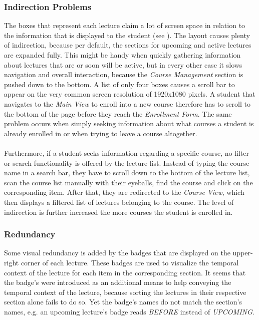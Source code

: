 \subsubsection{Indirection Problems}

The boxes that represent each lecture claim a lot of screen space in relation to the information that is displayed to the student (see ). The layout causes plenty of indirection, because per default, the sections for upcoming and active lectures are expanded fully. This might be handy when quickly gathering information about lectures that are or soon will be active, but in every other case it slows navigation and overall interaction, because the \emph{Course Management} section is pushed down to the bottom.
A list of only four boxes causes a scroll bar to appear on the very common screen resolution of 1920x1080 pixels. A student that navigates to the \emph{Main View} to enroll into a new course therefore has to scroll to the bottom of the page before they reach the \emph{Enrollment Form}. The same problem occurs when simply seeking information about what courses a student is already enrolled in or when trying to leave a course altogether. 
\\
\\
Furthermore, if a student seeks information regarding a specific course, no filter or search functionality is offered by the lecture list. Instead of typing the course name in a search bar, they have to scroll down to the bottom of the lecture list, scan the course list manually with their eyeballs, find the course and click on the corresponding item. After that, they are redirected to the \emph{Course View}, which then displays a filtered list of lectures belonging to the course. The level of indirection is further increased the more courses the student is enrolled in. 

\subsubsection{Redundancy}

Some visual redundancy is added by the badges that are displayed on the upper-right corner of each lecture. These badges are used to visualize the temporal context of the lecture for each item in the corresponding section. It seems that the badge's were introduced as an additional means to help conveying the temporal context of the lecture, because sorting the lectures in their respective section alone fails to do so.
Yet the badge's names do not match the section's names, e.g. an upcoming lecture's badge reads \emph{BEFORE} instead of \emph{UPCOMING}. 


